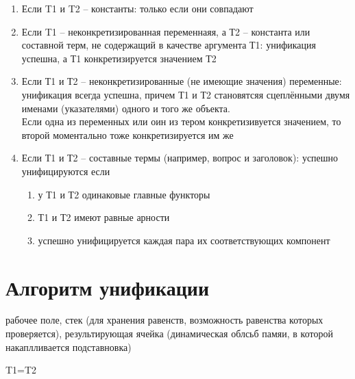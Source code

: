 \documentclass[12pt]{report}
\begin{document}
\begin{enumerate}
    \item Если T1 и T2 -- константы: только если они совпадают
    \item Если T1 -- неконкретизированная переменнаяя, а Т2 -- константа или составной терм, не содержащий в качестве аргумента Т1: унификация успешна, а Т1 конкретизируется значением Т2
    \item Если Т1 и Т2 -- неконкретизированные (не имеющие значения) переменные: унификация всегда успешна, причем Т1 и Т2 становятсяя сцеплёнными двумя именами (указателями) одного и того же объекта. \\Если одна из переменных или оин из тером конкретизивуется значением, то второй моментально тоже конкретизируется им же
    \item Если Т1 и Т2 -- составные термы (например, вопрос и заголовок): успешно унифицируются если
    \begin{enumerate}
        \item у Т1 и Т2 одинаковые главные функторы
        \item Т1 и Т2 имеют равные арности
        \item успешно унифицируется каждая пара их  соответствующих компонент
    \end{enumerate}
\end{enumerate}







\section*{Алгоритм унификации}

рабочее поле, стек (для хранения равенств, возможность равенства которых проверяется), результирующая ячейка (динамическая облсьб памяи, в которой накаплливается подставновка)

T1=T2
\end{document}
